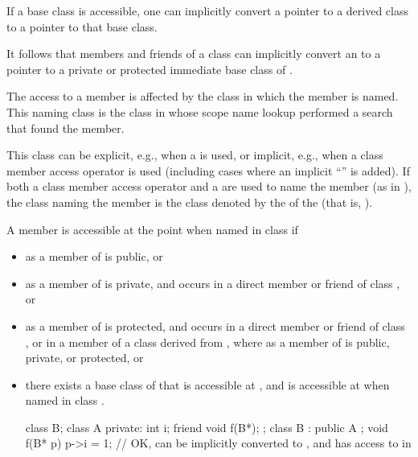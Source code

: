 \pnum
If a base class is accessible, one can implicitly convert a pointer to
a derived class to a pointer to that base class.
\begin{note}
It follows that
members and friends of a class
can implicitly convert an
to a pointer to a private or protected immediate base class of
.
\end{note}
The access to a member is affected by the class in which the member is
named.
This naming class is
the class in whose scope name lookup performed a search that found the member.
\begin{note}
This class can be explicit, e.g., when a
is used, or implicit, e.g., when a class member access operator is used (including cases where an implicit
``''
is
added).
If both a class member access operator and a
are used to name the member (as in
),
the class naming the member is the class denoted by the
of the
(that is,
).
\end{note}
A member
is accessible at the point
when named in class
if
\begin{itemize}
\item
{}
as a member of
is public, or
\item
{}
as a member of
is private, and
occurs in a direct member or friend of class
,
or
\item
{}
as a member of
is protected, and
occurs in a direct member or friend of class
,
or in a member of a class
derived from
,
where
as a member of
is public, private, or protected, or
\item
there exists a base class
of
that is accessible at
,
and
is accessible at
when named in class
.
\begin{example}
\begin{codeblock}
class B;
class A {
private:
  int i;
  friend void f(B*);
};
class B : public A { };
void f(B* p) {
  p->i = 1;         // OK,  can be implicitly converted to , and  has access to  in 
}
\end{codeblock}
\end{example}
\end{itemize}

